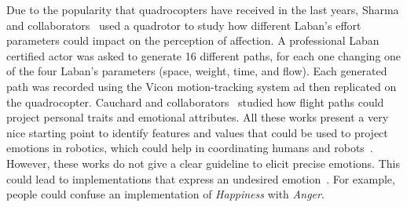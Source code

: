 Due to the popularity that quadrocopters have received in the last years, Sharma and collaborators~\cite{Sharma2013} used a quadrotor to study how different Laban's effort~\cite{Laban1968} parameters could impact on the perception of affection. A professional Laban certified actor was asked to generate 16 different paths, for each one changing one of the four Laban's parameters (space, weight, time, and flow). Each generated path was recorded using the Vicon motion-tracking system ad then replicated on the quadrocopter. Cauchard and collaborators~\cite{Cauchard2016} studied how flight paths could project personal traits and emotional attributes. All these works present a very nice starting point to identify features and values that could be used to project emotions in robotics, which could help in coordinating humans and robots~\cite{Novika2015}. However, these works do not give a clear guideline to elicit precise emotions. This could lead to implementations that express an undesired emotion~\cite{Angel2016}. For example, people could confuse an implementation of \textit{Happiness} with \textit{Anger}.
